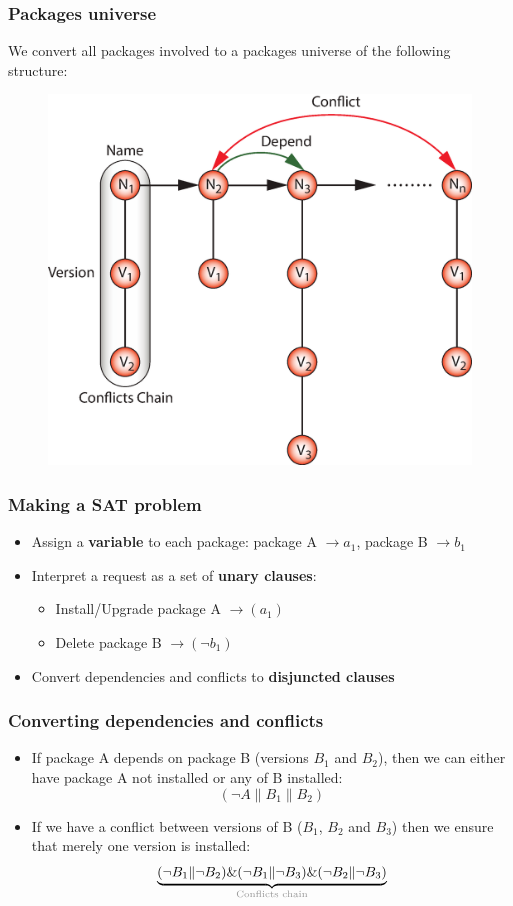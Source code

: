 \documentclass{beamer}
\begin{document}
\begin{frame}
\frametitle{Packages universe}
We convert all packages involved to a packages universe of the following
structure:
\begin{figure}[h!]
  \centering
  \includegraphics[height=0.7\textheight]{q5.eps}
\end{figure}
\end{frame}

\begin{frame}
\frametitle{Making a SAT problem}
\begin{itemize}
  \item Assign a \textbf{variable} to each package: 
  package A $\to a_1$, package B $\to b_1$
  \item<2-> Interpret a request as a set of \textbf{unary clauses}:
  \begin{itemize}
    \item<2-> Install/Upgrade package A $\to (a_1)$
    \item<2-> Delete package B $\to (\neg b_1)$
  \end{itemize}
  \item<3-> Convert dependencies and conflicts to \textbf{disjuncted clauses}
\end{itemize}

\end{frame}

\begin{frame}
\frametitle{Converting dependencies and conflicts}
\begin{itemize}
  \item If package A depends on package B (versions $B_1$ and $B_2$), then we
  can either have package A not installed or any of B installed:
  \bigskip
\[
(\neg A \| B_1 \| B_2)
\]
\pause
  \item If we have a conflict between versions of B ($B_1$, $B_2$ and $B_3$)
 then we ensure that merely one version is installed:
  \bigskip
\[
\underbrace{(\neg B_1 \| \neg B_2) \& (\neg B_1 \| \neg B_3) \& (\neg B_2 \|
\neg B_3)}_{\text{\color{light-gray}Conflicts chain}}
\]
\end{itemize}
\end{frame}
\end{document}
